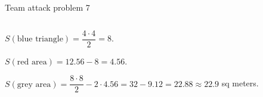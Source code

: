 \documentclass[9pt,aspectratio=169,handout]{beamer}
\begin{document}
\begin{frame}{Team attack problem 7}
\begin{columns}[T]
\begin{column}{0.5\textwidth}
      $S(\text{blue triangle}) = \dfrac{4\cdot 4}{2} = 8$.
      
      $S(\text{red area}) = 12.56 - 8 = 4.56$.

      $S(\text{grey area}) = \dfrac{8 \cdot 8}{2} - 2 \cdot 4.56 = 32 - 9.12 = 22.88 \approx \boxed{22.9}$ sq meters.
    \end{column}
    \begin{column}{0.5\textwidth}
    \end{column}
  \end{columns}
\end{frame}

\end{document}
